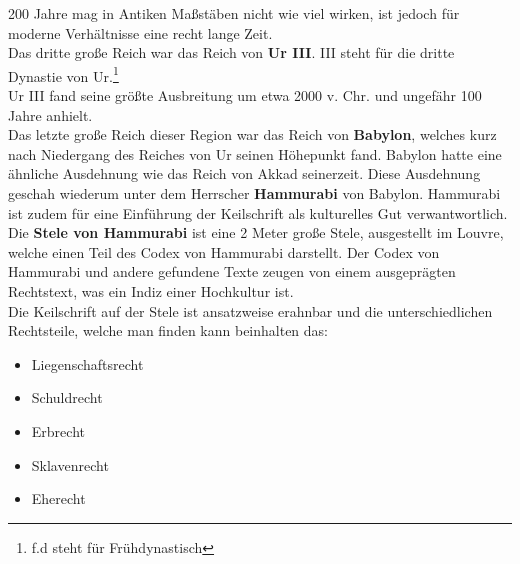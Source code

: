 \documentclass{article}
\begin{document}
	200 Jahre mag in Antiken Maßstäben nicht wie viel wirken, ist jedoch für moderne Verhältnisse eine recht lange Zeit. \\
	Das dritte große Reich war das Reich von \textbf{Ur III}. III steht für die dritte Dynastie von Ur.\footnote{f.d steht für Frühdynastisch} \\
	Ur III fand seine größte Ausbreitung um etwa 2000 v. Chr. und ungefähr 100 Jahre anhielt. \\
	Das letzte große Reich dieser Region war das Reich von \textbf{Babylon}, welches kurz nach Niedergang des Reiches von Ur seinen Höhepunkt fand. Babylon hatte eine ähnliche Ausdehnung wie das Reich von Akkad seinerzeit. Diese Ausdehnung geschah wiederum unter dem Herrscher \textbf{Hammurabi} von Babylon. Hammurabi ist zudem für eine Einführung der Keilschrift als kulturelles Gut verwantwortlich. Die \textbf{Stele von Hammurabi} ist eine 2 Meter große Stele, ausgestellt im Louvre, welche einen Teil des Codex von Hammurabi darstellt. Der Codex von Hammurabi und andere gefundene Texte zeugen von einem ausgeprägten Rechtstext, was ein Indiz einer Hochkultur ist. \\
	Die Keilschrift auf der Stele ist ansatzweise erahnbar und die unterschiedlichen Rechtsteile, welche man finden kann beinhalten das:
	\begin{itemize}
		\item{Liegenschaftsrecht}
		\item{Schuldrecht}
		\item{Erbrecht}
		\item{Sklavenrecht}
		\item{Eherecht}
	\end{itemize}
\end{document}
